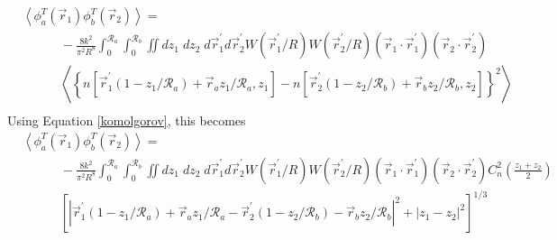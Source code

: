 \begin{equation}\label{tphase_n2}
\begin{aligned}
&\left\langle \phi^{T}_{a}\left(\vec{r}_{1}\right) \phi^{T}_{b}\left(\vec{r}_{2}\right)\right\rangle = \\
&\quad\quad\quad
-\frac{8k^{2}}{\pi^{2}R^{8}} \int_{0}^{\mathcal{R}_{a}}  \int_{0}^{\mathcal{R}_{b}} \iint dz_{1} \; dz_{2} \; d\vec{r}^{\prime}_{1}d\vec{r}^{\prime}_{2} W(\vec{r}^{\prime}_{1}/R) W(\vec{r}^{\prime}_{2}/R)
\left(\vec{r}_{1} \cdot \vec{r}^{\prime}_{1}\right)
\left(\vec{r}_{2} \cdot \vec{r}^{\prime}_{2}\right)
\\
&\quad\quad\quad
\left\langle \left\{ n\left[\vec{r}^{\prime}_{1}\left(1-z_{1}/\mathcal{R}_{a}\right) + \vec{r}_{a} z_{1}/\mathcal{R}_{a}, z_{1}\right] - 
 n\left[\vec{r}^{\prime}_{2}\left(1-z_{2}/\mathcal{R}_{b}\right) + \vec{r}_{b} z_{2}/\mathcal{R}_{b}, z_{2}\right]\right\}^{2} \right\rangle \\
\end{aligned}
\end{equation}
Using Equation \ref{komolgorov}, this becomes
\begin{equation}\label{tphase_n3}
\begin{aligned}
&\left\langle \phi^{T}_{a}\left(\vec{r}_{1}\right) \phi^{T}_{b}\left(\vec{r}_{2}\right)\right\rangle = \\
&\quad\quad\quad
-\frac{8k^{2}}{\pi^{2}R^{8}} \int_{0}^{\mathcal{R}_{a}}  \int_{0}^{\mathcal{R}_{b}} \iint dz_{1} \; dz_{2} \; d\vec{r}^{\prime}_{1}d\vec{r}^{\prime}_{2} W(\vec{r}^{\prime}_{1}/R) W(\vec{r}^{\prime}_{2}/R)
\left(\vec{r}_{1} \cdot \vec{r}^{\prime}_{1}\right)
\left(\vec{r}_{2} \cdot \vec{r}^{\prime}_{2}\right)
C_{n}^{2}\left(\frac{z_{1} + z_{2}}{2}\right) 
\\
&\quad\quad\quad
\left[ \left\vert \vec{r}^{\prime}_{1}\left(1-z_{1}/\mathcal{R}_{a}\right) + \vec{r}_{a} z_{1}/\mathcal{R}_{a} - 
 \vec{r}^{\prime}_{2}\left(1-z_{2}/\mathcal{R}_{b}\right) - \vec{r}_{b} z_{2}/\mathcal{R}_{b}\right\vert^{2} + 
\left\vert z_{1} - z_{2} \right\vert^{2} \right]^{1/3}
\end{aligned}
\end{equation}

